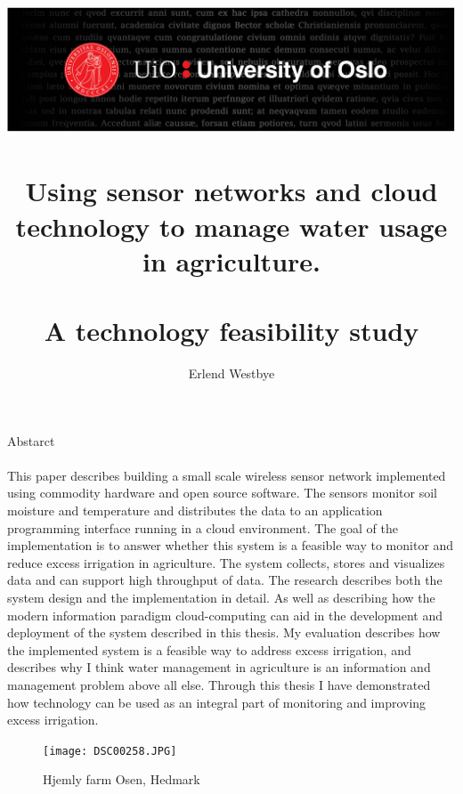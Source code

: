 \documentclass[]{uiophd}
\begin{document}
\title{\includegraphics[scale=0.5]{toppfelt-english.jpg}\\\\
Using sensor networks and cloud technology to manage water usage in agriculture.
\\\\
\large A technology feasibility study}
\author{Erlend Westbye}


\frontmatter
\maketitle
Abstarct
\\\\
This paper describes building a small scale wireless sensor network implemented using commodity hardware and open source software. The sensors monitor soil moisture and temperature and distributes the data to an application programming interface running in a cloud environment. The goal of the implementation is to answer whether this system is a feasible way to monitor and reduce excess irrigation in agriculture. The system collects, stores and visualizes data and can support high throughput of data. The research describes both the system design and the implementation in detail. As well as describing how the modern information paradigm cloud-computing can aid in the development and deployment of the system described in this thesis. My evaluation describes how the implemented system is a feasible way to address excess irrigation, and describes why I think water management in agriculture is an information and management problem above all else. Through this thesis I have demonstrated how technology can be used as an integral part of monitoring and improving excess irrigation.

\begin{figure}[h]
\caption{Hjemly farm Osen, Hedmark}
\centering
\texttt{[image: DSC00258.JPG]}
\end{figure}
\tableofcontents
\linespread{1.3}



\mainmatter
\end{document}
